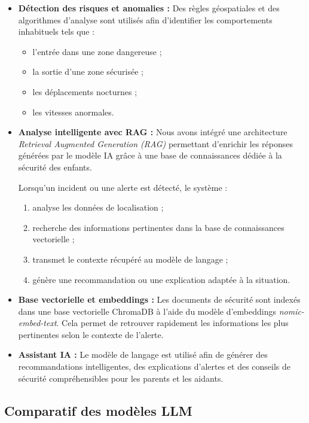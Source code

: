 \begin{itemize}
    \item \textbf{Détection des risques et anomalies :}  
    Des règles géospatiales et des algorithmes d’analyse sont utilisés afin d’identifier les comportements inhabituels tels que :
    \begin{itemize}
        \item l’entrée dans une zone dangereuse ;
        \item la sortie d’une zone sécurisée ;
        \item les déplacements nocturnes ;
        \item les vitesses anormales.
    \end{itemize}

    \item \textbf{Analyse intelligente avec RAG :}  
    Nous avons intégré une architecture \textit{Retrieval Augmented Generation (RAG)} permettant d’enrichir les réponses générées par le modèle IA grâce à une base de connaissances dédiée à la sécurité des enfants.

    Lorsqu’un incident ou une alerte est détecté, le système :
    \begin{enumerate}
        \item analyse les données de localisation ;
        \item recherche des informations pertinentes dans la base de connaissances vectorielle ;
        \item transmet le contexte récupéré au modèle de langage ;
        \item génère une recommandation ou une explication adaptée à la situation.
    \end{enumerate}

    \item \textbf{Base vectorielle et embeddings :}  
    Les documents de sécurité sont indexés dans une base vectorielle ChromaDB à l’aide du modèle d’embeddings \textit{nomic-embed-text}. Cela permet de retrouver rapidement les informations les plus pertinentes selon le contexte de l’alerte.

    \item \textbf{Assistant IA :}  
    Le modèle de langage est utilisé afin de générer des recommandations intelligentes, des explications d’alertes et des conseils de sécurité compréhensibles pour les parents et les aidants.
\end{itemize}

\subsection{Comparatif des modèles LLM}

